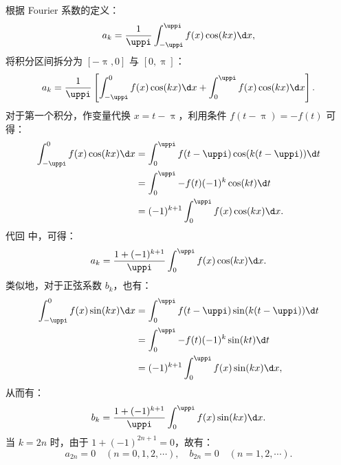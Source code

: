 \begin{myproof}
    根据 Fourier 系数的定义：
    \begin{equation}\label{eq:ak-def}
        a_k = \frac{1}{\uppi} \int_{-\uppi}^{\uppi} f(x) \cos(kx) \d x,
    \end{equation}
    将积分区间拆分为 $[-\uppi, 0]$ 与 $[0, \uppi]$：
    \begin{equation}\label{eq:ak-split}
        a_k = \frac{1}{\uppi} \left[ \int_{-\uppi}^{0} f(x) \cos(kx) \d x + \int_{0}^{\uppi} f(x) \cos(kx) \d x \right].
    \end{equation}
    对于第一个积分，作变量代换 $x = t - \uppi$，利用条件 $f(t - \uppi) = -f(t)$ 可得：
    \begin{equation}\label{eq:ak-sub}
        \begin{aligned}
            \int_{-\uppi}^{0} f(x) \cos(kx) \d x & = \int_{0}^{\uppi} f(t - \uppi) \cos(k(t - \uppi)) \d t \\
                                                 & = \int_{0}^{\uppi} -f(t) (-1)^k \cos(kt) \d t           \\
                                                 & = (-1)^{k+1} \int_{0}^{\uppi} f(x) \cos(kx) \d x.
        \end{aligned}
    \end{equation}
    代回  中，可得：
    \begin{equation}
        a_k = \frac{1 + (-1)^{k+1}}{\uppi} \int_{0}^{\uppi} f(x) \cos(kx) \d x.
    \end{equation}
    类似地，对于正弦系数 $b_k$，也有：
    \begin{equation}
        \begin{aligned}
            \int_{-\uppi}^{0} f(x) \sin(kx) \d x & = \int_{0}^{\uppi} f(t - \uppi) \sin(k(t - \uppi)) \d t \\
                                                 & = \int_{0}^{\uppi} -f(t) (-1)^k \sin(kt) \d t           \\
                                                 & = (-1)^{k+1} \int_{0}^{\uppi} f(x) \sin(kx) \d x,
        \end{aligned}
    \end{equation}
    从而有：
    \begin{equation}
        b_k = \frac{1 + (-1)^{k+1}}{\uppi} \int_{0}^{\uppi} f(x) \sin(kx) \d x.
    \end{equation}
    当 $k = 2n$ 时，由于 $1 + (-1)^{2n+1} = 0$，故有：
    \begin{equation}
        \boxed{a_{2n} = 0 \quad (n = 0, 1, 2, \cdots), \quad b_{2n} = 0 \quad (n = 1, 2, \cdots)}.
    \end{equation}


\end{myproof}
